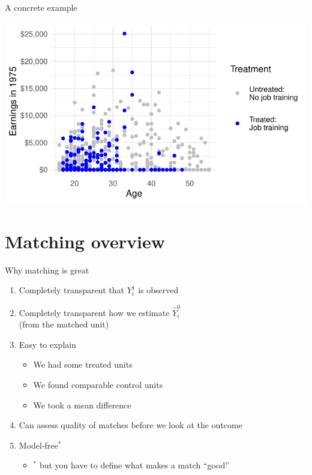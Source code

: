 \documentclass{beamer}
\begin{document}
\begin{frame}{A concrete example}

\includegraphics[width = \textwidth]{figures/lalonde_data}

\end{frame}

\section{Matching overview}

\begin{frame}{Why matching is great} \pause

\begin{enumerate}[<+->]
\item Completely transparent that $Y_i^1$ is observed
\item Completely transparent how we estimate $\hat{Y}_i^0$\\(from the matched unit)
\item Easy to explain
\begin{itemize}
\item We had some treated units
\item We found comparable control units
\item We took a mean difference
\end{itemize}
\item Can assess quality of matches before we look at the outcome
\item Model-free${}^*$
\begin{itemize}
\item ${}^*$ but you have to define what makes a match ``good''
\end{itemize}
\end{enumerate}

\end{frame}
\end{document}
